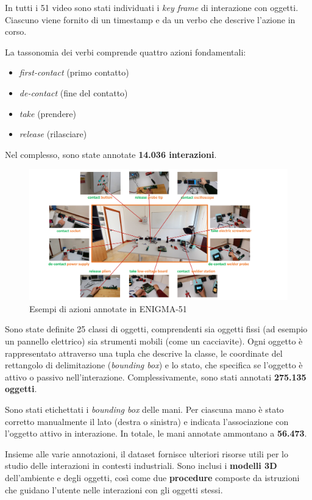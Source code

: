 In tutti i 51 video sono stati individuati i \emph{key frame} di interazione con oggetti. Ciascuno viene fornito di un timestamp e da un verbo che descrive l'azione in corso.  

La tassonomia dei verbi comprende quattro azioni fondamentali:  
\begin{itemize}
    \item \emph{first-contact} (primo contatto)  
    \item \emph{de-contact} (fine del contatto)  
    \item \emph{take} (prendere)  
    \item \emph{release} (rilasciare)  
\end{itemize}

Nel complesso, sono state annotate \textbf{14.036 interazioni}.

\begin{figure}[ht]
    \centering
    \includegraphics[width=1\linewidth]{Images/enigma_verbs.png}
    \caption{Esempi di azioni annotate in ENIGMA-51}
\end{figure}

Sono state definite 25 classi di oggetti, comprendenti sia oggetti fissi (ad esempio un pannello elettrico) sia strumenti mobili (come un cacciavite).  
Ogni oggetto è rappresentato attraverso una tupla che descrive la classe, le coordinate del rettangolo di delimitazione (\emph{bounding box}) e lo stato, che specifica se l'oggetto è attivo o passivo nell'interazione.  
Complessivamente, sono stati annotati \textbf{275.135 oggetti}.  

Sono stati etichettati i \emph{bounding box} delle mani.  
Per ciascuna mano è stato corretto manualmente il lato (destra o sinistra) e indicata l'associazione con l'oggetto attivo in interazione.  
In totale, le mani annotate ammontano a \textbf{56.473}.

Insieme alle varie annotazioni, il dataset fornisce ulteriori risorse utili per lo studio delle interazioni in contesti industriali.  
Sono inclusi i \textbf{modelli 3D} dell'ambiente e degli oggetti, così come due \textbf{procedure} composte da istruzioni che guidano l'utente nelle interazioni con gli oggetti stessi.


